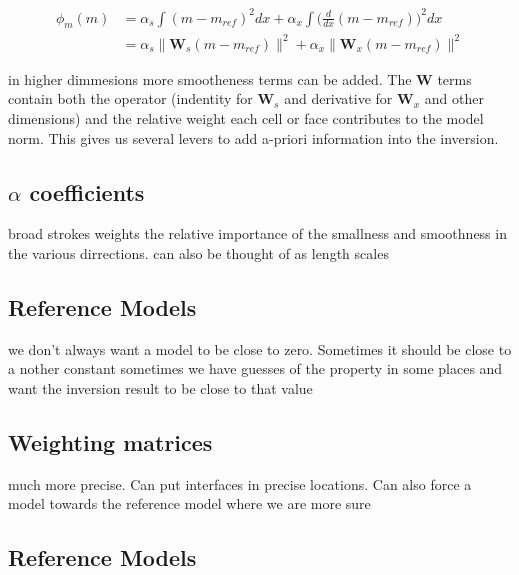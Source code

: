 \begin{align}
\phi_m(m) &= \alpha_s\int(m-m_{ref})^2dx+\alpha_x\int\bigg(\frac{d}{dx}(m-m_{ref})\bigg)^2dx\\
&=\alpha_s\|\textbf{W}_s(m-m_{ref})\|^2+\alpha_x\|\textbf{W}_x(m-m_{ref})\|^2
\end{align}

in higher dimmesions more smootheness terms can be added. The $\textbf{W}$ terms contain both the operator (indentity for $\textbf{W}_s$ and derivative for $\textbf{W}_x$ and other dimensions) and the relative weight each cell or face contributes to the model norm. This gives us several levers to add a-priori information into the inversion.

\subsection{$\alpha$ coefficients}
\label{alpha coefficients}

broad strokes weights the relative importance of the smallness and smoothness in the various dirrections. can also be thought of as length scales

\subsection{Reference Models}
\label{Reference Models}

we don't always want a model to be close to zero. Sometimes it should be close to a nother constant sometimes we have guesses of the property in some places and want the inversion result to be close to that value

\subsection{Weighting matrices}
\label{Weighting matrices}

much more precise. Can put interfaces in precise locations. Can also force a model towards the reference model where we are more sure

\subsection{Reference Models}
\label{Reference Models}

\endinput

Any text after an \endinput is ignored.
You could put scraps here or things in progress.

